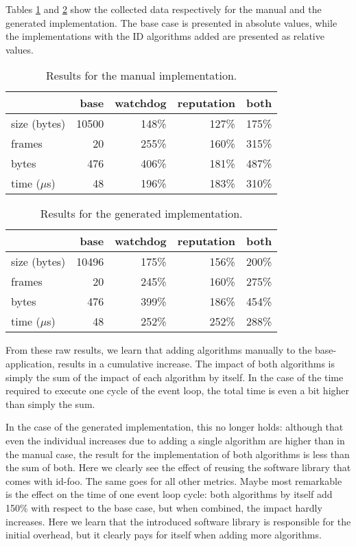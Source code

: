 \documentclass[conference]{IEEEtran}
\newcommand{\NAME}{id-foo\xspace}
\begin{document}
Tables \ref{tbl:manual} and \ref{tbl:generated} show the collected data
respectively for the manual and the generated implementation. The base case is
presented in absolute values, while the implementations with the ID algorithms
added are presented as relative values.

\begin{table}[H]
  \centering
  \begin{tabular}{lrrrr}
  \hline
      & base & watchdog & reputation & both\\
  \hline
  size (bytes) & 10500 & 148\% & 127\% & 175\%\\
  frames & 20 & 255\% & 160\% & 315\%\\
  bytes & 476 & 406\% & 181\% & 487\%\\
  time ($\mu$s) & 48 & 196\% & 183\% & 310\%\\
  \hline
  \end{tabular}
  \caption{Results for the manual implementation.}
  \label{tbl:manual}
\end{table}

\begin{table}[H]
  \centering
  \begin{tabular}{lrrrr}
  \hline
         & base & watchdog & reputation & both\\
  \hline
  size (bytes) & 10496 & 175\% & 156\% & 200\%\\
  frames & 20 & 245\% & 160\% & 275\%\\
  bytes & 476 & 399\% & 186\% & 454\%\\
  time ($\mu$s) & 48 & 252\% & 252\% & 288\%\\
  \hline
  \end{tabular}
  \caption{Results for the generated implementation.}
  \label{tbl:generated}
\end{table}

From these raw results, we learn that adding algorithms manually to the
base-application, results in a cumulative increase. The impact of both
algorithms is simply the sum of the impact of each algorithm by itself. In the
case of the time required to execute one cycle of the event loop, the total
time is even a bit higher than simply the sum.

In the case of the generated implementation, this no longer holds: although
that even the individual increases due to adding a single algorithm are higher
than in the manual case, the result for the implementation of both algorithms
is less than the sum of both. Here we clearly see the effect of reusing the
software library that comes with \NAME. The same goes for all other metrics.
Maybe most remarkable is the effect on the time of one event loop cycle: both
algorithms by itself add 150\% with respect to the base case, but when
combined, the impact hardly increases. Here we learn that the introduced
software library is responsible for the initial overhead, but it clearly pays
for itself when adding more algorithms.
\end{document}
